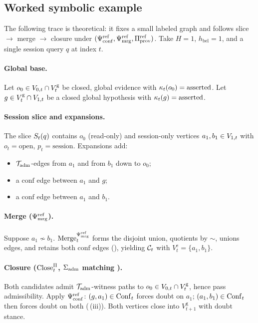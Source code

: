 \subsection{Worked symbolic example}
\label{app:worked-example}

The following trace is theoretical: it fixes a small labeled graph and follows slice $\to$ merge $\to$ closure under $(\Psi_{\mathrm{conf}}^{\mathrm{ref}},\Psi_{\mathrm{mrg}}^{\mathrm{ref}},\Pi_{\mathrm{prov}}^{\mathrm{ref}})$.
Take $H=1$, $h_{\mathrm{bel}}=1$, and a single session query $q$ at index $t$.

\paragraph{Global base.}
Let $o_0\in V_{0,t}\cap V^{\mathrm{g}}_t$ be closed, global evidence with $\kappa_t(o_0)=\mathrm{asserted}$.
Let $g\in V^{\mathrm{g}}_t\cap V_{1,t}$ be a closed global hypothesis with $\kappa_t(g)=\mathrm{asserted}$.

\paragraph{Session slice and expansions.}
The slice $S_t(q)$ contains $o_0$ (read-only) and session-only vertices $a_1,b_1\in V_{1,t}$ with $o_t=\text{open}$, $p_t=\text{session}$.
Expansions add:
\begin{itemize}[leftmargin=*]
  \item $\mathcal{T}_{\mathrm{adm}}$-edges from $a_1$ and from $b_1$ down to $o_0$;
  \item a $\mathrm{conf}$ edge between $a_1$ and $g$;
  \item a $\mathrm{conf}$ edge between $a_1$ and $b_1$.
\end{itemize}

\paragraph{Merge ($\Psi_{\mathrm{mrg}}^{\mathrm{ref}}$).}
Suppose $a_1\not\sim b_1$.
$\mathrm{Merge}_t^{\Psi_{\mathrm{mrg}}^{\mathrm{ref}}}$ forms the disjoint union, quotients by $\sim$, unions edges, and retains both $\mathrm{conf}$ edges (), yielding $\mathcal{C}_t$ with $V^{\mathrm{c}}_t=\{a_1,b_1\}$.

\paragraph{Closure ($\mathrm{Close}_t^{\Pi}$, $\Sigma_{\mathrm{adm}}$ matching ).}
Both candidates admit $\mathcal{T}_{\mathrm{adm}}$-witness paths to $o_0\in V_{0,t}\cap V^{\mathrm{g}}_t$, hence pass admissibility.
Apply $\Psi_{\mathrm{conf}}^{\mathrm{ref}}$: $(g,a_1)\in\mathrm{Conf}_t$ forces doubt on $a_1$; $(a_1,b_1)\in\mathrm{Conf}_t$ then forces doubt on both (\,(iii)).
Both vertices close into $V^{\mathrm{g}}_{t+1}$ with $\mathrm{doubt}$ stance.

